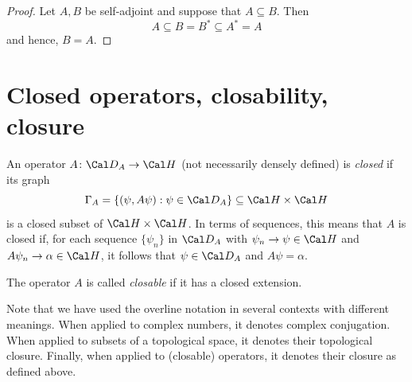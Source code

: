 
\begin{proof}
  Let $A,B$ be self-adjoint and suppose that $A\subseteq B$. Then
  \begin{equation*}
  A \subseteq B = B^* \subseteq A^* = A
  \end{equation*}
  and hence, $B=A$.
\end{proof}


\section{Closed operators, closability, closure}
\label{sec:closable-closure-closed}

\begin{definition}
  An operator \(A\colon\Cal D_A\to\Cal H\) (not necessarily densely
  defined) is \emph{closed} if its graph
  \begin{equation}
    \Gamma_A
    = \{(\psi,A\psi) : \psi\in\Cal D_A\}
    \subseteq \Cal H\times\Cal H
  \end{equation}
  is a closed subset of \(\Cal H\times\Cal H\).
  In terms of sequences, this means that \(A\) is closed if, for each
  sequence \(\{\psi_n\}\) in \(\Cal D_A\) with \(\psi_n\to\psi\in\Cal
  H\) and \(A\psi_n \to \alpha\in\Cal H\), it follows that
  \(\psi\in\Cal D_A\) and \(A\psi=\alpha\).

  The operator \(A\) is called \emph{closable} if it has a closed
  extension.
\end{definition}

\begin{remark}
Note that we have used the overline notation in several contexts with
different meanings. When applied to complex numbers, it denotes
complex conjugation. When applied to subsets of a topological space,
it denotes their topological closure. Finally, when applied to
(closable) operators, it denotes their closure as defined above.
\end{remark}

